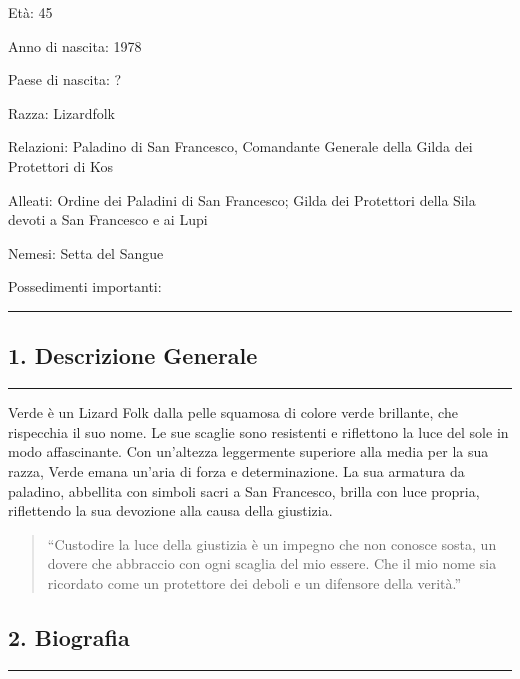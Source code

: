 Età: 45

Anno di nascita: 1978

Paese di nascita: ?

Razza: Lizardfolk

Relazioni: Paladino di San Francesco, Comandante Generale della Gilda
dei Protettori di Kos

Alleati: Ordine dei Paladini di San Francesco; Gilda dei Protettori
della Sila devoti a San Francesco e ai Lupi

Nemesi: Setta del Sangue

Possedimenti importanti:

\begin{center}\rule{0.5\linewidth}{0.5pt}\end{center}

\subsection{1. Descrizione Generale}\label{descrizione-generale}

\begin{center}\rule{0.5\linewidth}{0.5pt}\end{center}

Verde è un Lizard Folk dalla pelle squamosa di colore verde brillante,
che rispecchia il suo nome. Le sue scaglie sono resistenti e riflettono
la luce del sole in modo affascinante. Con un'altezza leggermente
superiore alla media per la sua razza, Verde emana un'aria di forza e
determinazione. La sua armatura da paladino, abbellita con simboli sacri
a San Francesco, brilla con luce propria, riflettendo la sua devozione
alla causa della giustizia.

\begin{quote}
``Custodire la luce della giustizia è un impegno che non conosce sosta,
un dovere che abbraccio con ogni scaglia del mio essere. Che il mio nome
sia ricordato come un protettore dei deboli e un difensore della
verità.''
\end{quote}

\subsection{2. Biografia}\label{biografia}

\begin{center}\rule{0.5\linewidth}{0.5pt}\end{center}

